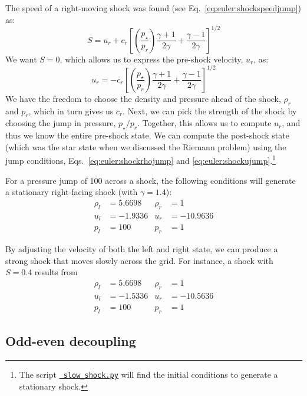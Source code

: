 The speed of a right-moving shock was found (see
Eq.~\ref{eq:euler:shockspeedjump}) as:
\begin{equation}
S = u_r + c_r \left [ \left ( \frac{p_\star}{p_r} \right ) \frac{\gamma+1}{2\gamma} + \frac{\gamma-1}{2\gamma} \right ]^{1/2}
\end{equation}
We want $S = 0$, which allows us to express the pre-shock velocity, $u_r$, as:
\begin{equation}
u_r = -c_r \left [ \left ( \frac{p_\star}{p_r} \right ) \frac{\gamma+1}{2\gamma} + \frac{\gamma-1}{2\gamma} \right ]^{1/2}
\end{equation}
We have the freedom to choose the density and pressure ahead of the
shock, $\rho_r$ and $p_r$, which in turn gives us $c_r$.  Next, we can
pick the strength of the shock by choosing the jump in pressure,
$p_\star/p_r$.  Together, this allows us to compute $u_r$, and thus we
know the entire pre-shock state.  We can compute the post-shock state
(which was the star state when we discussed the Riemann problem) using
the jump conditions, Eqs.~\ref{eq:euler:shockrhojump} and
\ref{eq:euler:shockujump}.\footnote{The script
  \href{https://github.com/zingale/hydro_examples/blob/master/compressible/slow_shock.py}{\tt
    slow\_shock.py} will find the initial conditions to generate a
  stationary shock.}

For a pressure jump of 100 across a shock, the following conditions will
generate a stationary right-facing shock (with $\gamma = 1.4$):
\begin{align}
\rho_l &= 5.6698      &  \rho_r &= 1 \nonumber \\
u_l   &= -1.9336      &  u_r    &= -10.9636   \\
p_l    &= 100         &  p_r    &= 1 \nonumber
\end{align}

By adjusting the velocity of both the left and right state, we can
produce a strong shock that moves slowly across the grid.  For
instance, a shock with $S = 0.4$ results from
\begin{align}
\rho_l &= 5.6698      &  \rho_r &= 1 \nonumber \\
u_l   &= -1.5336      &  u_r    &= -10.5636   \\
p_l    &= 100         &  p_r    &= 1 \nonumber
\end{align}


\subsection{Odd-even decoupling}

